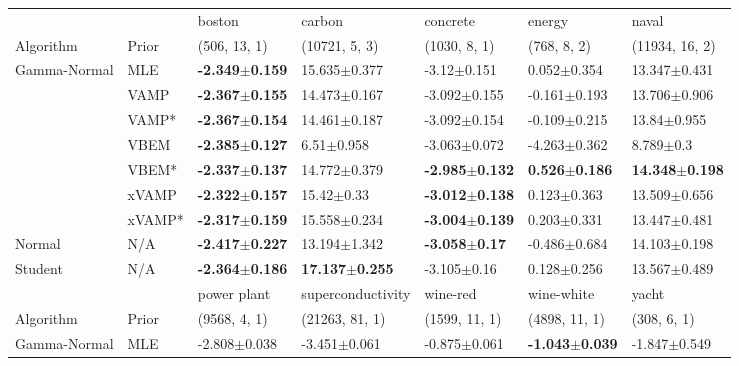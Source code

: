 \begin{tabular}{lllllll}
\toprule
        &     &                     boston &                     carbon &                   concrete &                    energy &                      naval \\
Algorithm & Prior& (506, 13, 1)& (10721, 5, 3)& (1030, 8, 1)& (768, 8, 2)& (11934, 16, 2)\\
\midrule
Gamma-Normal & MLE &  \textbf{-2.349$\pm$0.159} &           15.635$\pm$0.377 &            -3.12$\pm$0.151 &           0.052$\pm$0.354 &           13.347$\pm$0.431 \\
        & VAMP &  \textbf{-2.367$\pm$0.155} &           14.473$\pm$0.167 &           -3.092$\pm$0.155 &          -0.161$\pm$0.193 &           13.706$\pm$0.906 \\
        & VAMP* &  \textbf{-2.367$\pm$0.154} &           14.461$\pm$0.187 &           -3.092$\pm$0.154 &          -0.109$\pm$0.215 &            13.84$\pm$0.955 \\
        & VBEM &  \textbf{-2.385$\pm$0.127} &             6.51$\pm$0.958 &           -3.063$\pm$0.072 &          -4.263$\pm$0.362 &              8.789$\pm$0.3 \\
        & VBEM* &  \textbf{-2.337$\pm$0.137} &           14.772$\pm$0.379 &  \textbf{-2.985$\pm$0.132} &  \textbf{0.526$\pm$0.186} &  \textbf{14.348$\pm$0.198} \\
        & xVAMP &  \textbf{-2.322$\pm$0.157} &             15.42$\pm$0.33 &  \textbf{-3.012$\pm$0.138} &           0.123$\pm$0.363 &           13.509$\pm$0.656 \\
        & xVAMP* &  \textbf{-2.317$\pm$0.159} &           15.558$\pm$0.234 &  \textbf{-3.004$\pm$0.139} &           0.203$\pm$0.331 &           13.447$\pm$0.481 \\
Normal & N/A &  \textbf{-2.417$\pm$0.227} &           13.194$\pm$1.342 &   \textbf{-3.058$\pm$0.17} &          -0.486$\pm$0.684 &           14.103$\pm$0.198 \\
Student & N/A &  \textbf{-2.364$\pm$0.186} &  \textbf{17.137$\pm$0.255} &            -3.105$\pm$0.16 &           0.128$\pm$0.256 &           13.567$\pm$0.489 \\
\midrule
        &     &                power plant &          superconductivity &                  wine-red &                 wine-white &                      yacht \\
Algorithm & Prior& (9568, 4, 1)& (21263, 81, 1)& (1599, 11, 1)& (4898, 11, 1)& (308, 6, 1)\\
\midrule
Gamma-Normal & MLE &           -2.808$\pm$0.038 &           -3.451$\pm$0.061 &          -0.875$\pm$0.061 &  \textbf{-1.043$\pm$0.039} &           -1.847$\pm$0.549 \\

\end{tabular}
